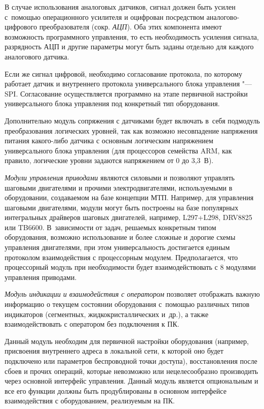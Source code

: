 В случае использования аналоговых датчиков, сигнал должен быть усилен с~помощью операционного усилителя и оцифрован посредством аналогово-цифрового преобразователя (сокр. \textit{АЦП}). Оба этих компонента имеют возможность программного управления, то есть необходимость усиления сигнала, разрядность АЦП и другие параметры могут быть заданы отдельно для каждого аналогового датчика.

Если же сигнал цифровой, необходимо согласование протокола, по которому работает датчик и внутреннего протокола универсального блока управления "--- \foreignlanguage{english}{SPI}. Согласование осуществляется программно на этапе первичной настройки универсального блока управления под конкретный тип оборудования.

Дополнительно модуль сопряжения с датчиками будет включать в~себя подмодуль преобразования логических уровней, так как возможно несовпадение напряжения питания какого-либо датчика с основным логическим напряжением универсального блока управления (для процессоров семейства \foreignlanguage{english}{ARM}, как правило, логические уровни задаются напряжением от 0 до 3,3~В).

\textit{Модули управления приводами} являются силовыми и позволяют управлять шаговыми двигателями и прочими электродвигателями, используемыми в оборудовании, создаваемом на базе концепции \foreignlanguage{english}{МТП}. Например, для управления шаговыми двигателями, модули могут быть построены на базе популярных интегральных драйверов шаговых двигателей, например, \foreignlanguage{english}{L}297+\foreignlanguage{english}{L}298, \foreignlanguage{english}{DRV}8825 или \foreignlanguage{english}{TB}6600. В~зависимости от задач, решаемых конкретным типом оборудования, возможно использование и более сложные и дорогие схемы управления двигателями, при этом универсальность достигается единым протоколом взаимодействия с процессорным модулем. Предполагается, что процессорный модуль при необходимости будет взаимодействовать с 8 модулями управления приводами.

\textit{Модуль индикации и взаимодействия с оператором} позволяет отображать важную информацию о текущем состоянии оборудования с~помощью различных типов индикаторов (сегментных, жидкокристаллических и~др.), а также взаимодействовать с оператором без подключения к ПК.

Данный модуль необходим для первичной настройки оборудования (например, присвоения внутреннего адреса в локальной сети, к которой оно будет подключено или параметров беспроводной точки доступа), восстановления после сбоев и прочих операций, которые невозможно или нецелесообразно производить через основной интерфейс управления. Данный модуль является опциональным и все его функции должны быть продублированы в основном интерфейсе взаимодействия с оборудованием, реализуемым на ПК.

